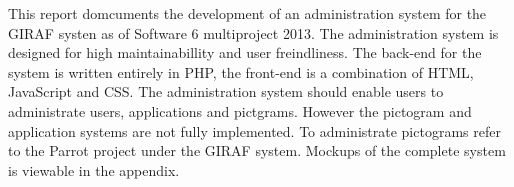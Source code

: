 This report domcuments the development of an administration system for the GIRAF systen as of Software 6 multiproject 2013. The administration system is designed for high maintainabillity and user freindliness. The back-end for the system is written entirely in PHP, the front-end is a combination of HTML, JavaScript and CSS. The administration system should enable users to administrate users, applications and pictgrams. However the pictogram and application systems are not fully implemented. To administrate pictograms refer to the Parrot project under the GIRAF system. Mockups of the complete system is viewable in the appendix.